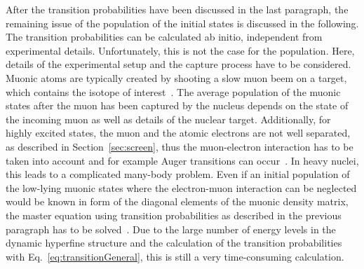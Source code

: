 After the transition probabilities have been discussed in the last paragraph, the remaining issue of the population of the initial states is discussed in the following.
The transition probabilities can be calculated ab initio, independent from experimental details. Unfortunately, this is not the case for the population. Here, details of the experimental setup and the capture process have to be considered. Muonic atoms are typically created by shooting a slow muon beem on a target, which contains the isotope of interest~\cite{wu1969,Devons1995,BorieRinker1982}. The average population of the muonic states after the muon has been captured by the nucleus depends on the state of the incoming muon as well as details of the nuclear target. Additionally, for highly excited states, the muon and the atomic electrons are not well separated, as described in Section~\ref{sec:screen}, thus the muon-electron interaction has to be taken into account and for example Auger transitions can occur~\cite{pisano1982}. In heavy nuclei, this leads to a complicated many-body problem. Even if an initial population of the low-lying muonic states where the electron-muon interaction can be neglected would be known in form of the diagonal elements of the muonic density matrix, the master equation using transition probabilities as described in the previous paragraph has to be solved~\cite{pisano1982}. Due to the large number of energy levels in the dynamic hyperfine structure and the calculation of the transition probabilities with Eq.~\eqref{eq:transitionGeneral}, this is still a very time-consuming calculation.

